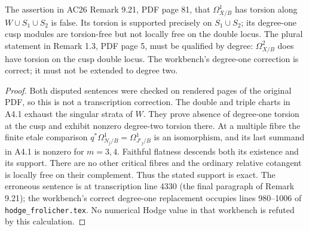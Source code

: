 \begin{proposition}\label{inv:A4.2}
The assertion in AC26 Remark 9.21, PDF page 81, that
$\Omega_{X/B}^1$ has torsion along $W\cup S_1\cup S_2$ is false.
Its torsion is supported precisely on $S_1\cup S_2$; its degree-one
cusp modules are torsion-free but not locally free on the double
locus.  The plural statement in Remark 1.3, PDF page 5, must be
qualified by degree: $\Omega^2_{X/B}$ does have torsion on the cusp
double locus.  The workbench's degree-one correction is correct;
it must not be extended to degree two.
\end{proposition}
\begin{proof}
Both disputed sentences were checked on rendered pages of the
original PDF, so this is not a transcription correction.  The
double and triple charts in A4.1 exhaust the singular strata of
$W$.  They prove absence of degree-one torsion at the cusp and
exhibit nonzero degree-two torsion there.  At a multiple fibre the
finite etale comparison
$q^*\Omega^1_{N_j/B}=\Omega^1_{J'_j/B}$ is an isomorphism,
and its last summand in A4.1 is nonzero for $m=3,4$.
Faithful flatness descends both its existence and its support.
There are no other critical fibres and the ordinary relative
cotangent is locally free on their complement.  Thus the stated
support is exact.  The erroneous sentence is at transcription
line 4330 (the final paragraph of Remark 9.21); the workbench's
correct degree-one replacement occupies lines 980--1006 of
\texttt{hodge\_frolicher.tex}.  No numerical Hodge value in that
workbench is refuted by this calculation.
\end{proof}
